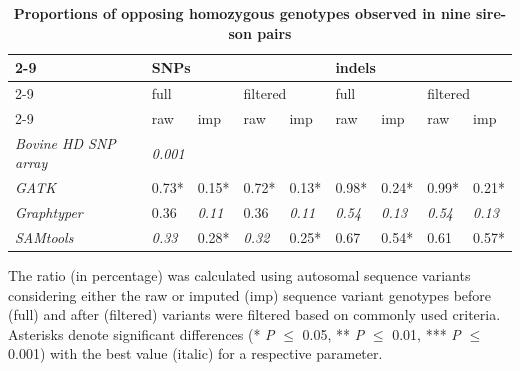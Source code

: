 \documentclass[../main.tex]{subfiles}
\begin{document}
\begin{table}
            \begin{center}
            \caption[Proportions of opposing homozygous genotypes observed in nine sire-son pairs]{\textbf{Proportions of opposing homozygous genotypes observed in nine sire-son pairs}}
            \small
            \begin{tabular}{|l|l|l|l|l|l|l|l|l|} 
            \cline{2-9}
            \multicolumn{1}{l!{\color{black}\vrule}}{~} & \multicolumn{4}{l|}{SNPs}                                     & \multicolumn{4}{l|}{indels}                                    \\ 
            \cline{2-9}
            \multicolumn{1}{l|}{~}                      & \multicolumn{2}{l|}{full}     & \multicolumn{2}{l|}{filtered} & \multicolumn{2}{l|}{full}     & \multicolumn{2}{l|}{filtered}  \\ 
            \cline{2-9}
            \multicolumn{1}{l|}{~}                      & raw           & imp           & raw           & imp           & raw           & imp           & raw           & imp            \\ 
            \hline
            \textit{Bovine HD SNP array}                & \multicolumn{8}{l|}{\textit{0.001}}                                                                                            \\ 
            \hline
            \textit{GATK}                               & 0.73*         & 0.15*         & 0.72*         & 0.13*         & 0.98*         & 0.24*         & 0.99*         & 0.21*          \\ 
            \hline
            \textit{Graphtyper}                         & 0.36          & \textit{0.11} & 0.36          & \textit{0.11} & \textit{0.54} & \textit{0.13} & \textit{0.54} & \textit{0.13}  \\ 
            \hline
            \textit{SAMtools}                           & \textit{0.33} & 0.28*         & \textit{0.32} & 0.25*         & 0.67          & 0.54*         & 0.61          & 0.57*          \\
            \hline
            \end{tabular}
            \label{tab:mendel}
            \end{center}
            \singlespacing
            \small{The ratio (in percentage) was calculated using autosomal sequence variants considering either 
            the raw or imputed (imp) sequence variant genotypes before (full) and after (filtered) variants were filtered based on commonly used criteria. 
            Asterisks denote significant differences (* \emph{P} $\leq$ 0.05, ** \emph{P} $\leq$ 0.01, *** \emph{P} $\leq$ 0.001) with the best value (italic) for a respective parameter.}

\end{table}
\end{document}
